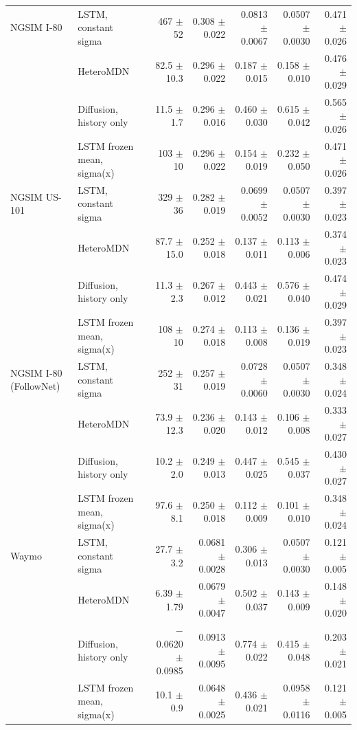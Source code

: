 \begin{table}[htbp]
\begin{tabular}{llrrrrr}
\midrule
NGSIM I-80 & LSTM, constant sigma & 467 $\pm$ 52 & 0.308 $\pm$ 0.022 & 0.0813 $\pm$ 0.0067 & 0.0507 $\pm$ 0.0030 & 0.471 $\pm$ 0.026 \\
 & HeteroMDN & 82.5 $\pm$ 10.3 & 0.296 $\pm$ 0.022 & 0.187 $\pm$ 0.015 & 0.158 $\pm$ 0.010 & 0.476 $\pm$ 0.029 \\
 & Diffusion, history only & 11.5 $\pm$ 1.7 & 0.296 $\pm$ 0.016 & 0.460 $\pm$ 0.030 & 0.615 $\pm$ 0.042 & 0.565 $\pm$ 0.026 \\
 & LSTM frozen mean, sigma(x) & 103 $\pm$ 10 & 0.296 $\pm$ 0.022 & 0.154 $\pm$ 0.019 & 0.232 $\pm$ 0.050 & 0.471 $\pm$ 0.026 \\
\midrule
NGSIM US-101 & LSTM, constant sigma & 329 $\pm$ 36 & 0.282 $\pm$ 0.019 & 0.0699 $\pm$ 0.0052 & 0.0507 $\pm$ 0.0030 & 0.397 $\pm$ 0.023 \\
 & HeteroMDN & 87.7 $\pm$ 15.0 & 0.252 $\pm$ 0.018 & 0.137 $\pm$ 0.011 & 0.113 $\pm$ 0.006 & 0.374 $\pm$ 0.023 \\
 & Diffusion, history only & 11.3 $\pm$ 2.3 & 0.267 $\pm$ 0.012 & 0.443 $\pm$ 0.021 & 0.576 $\pm$ 0.040 & 0.474 $\pm$ 0.029 \\
 & LSTM frozen mean, sigma(x) & 108 $\pm$ 10 & 0.274 $\pm$ 0.018 & 0.113 $\pm$ 0.008 & 0.136 $\pm$ 0.019 & 0.397 $\pm$ 0.023 \\
\midrule
NGSIM I-80 (FollowNet) & LSTM, constant sigma & 252 $\pm$ 31 & 0.257 $\pm$ 0.019 & 0.0728 $\pm$ 0.0060 & 0.0507 $\pm$ 0.0030 & 0.348 $\pm$ 0.024 \\
 & HeteroMDN & 73.9 $\pm$ 12.3 & 0.236 $\pm$ 0.020 & 0.143 $\pm$ 0.012 & 0.106 $\pm$ 0.008 & 0.333 $\pm$ 0.027 \\
 & Diffusion, history only & 10.2 $\pm$ 2.0 & 0.249 $\pm$ 0.013 & 0.447 $\pm$ 0.025 & 0.545 $\pm$ 0.037 & 0.430 $\pm$ 0.027 \\
 & LSTM frozen mean, sigma(x) & 97.6 $\pm$ 8.1 & 0.250 $\pm$ 0.018 & 0.112 $\pm$ 0.009 & 0.101 $\pm$ 0.010 & 0.348 $\pm$ 0.024 \\
\midrule
Waymo & LSTM, constant sigma & 27.7 $\pm$ 3.2 & 0.0681 $\pm$ 0.0028 & 0.306 $\pm$ 0.013 & 0.0507 $\pm$ 0.0030 & 0.121 $\pm$ 0.005 \\
 & HeteroMDN & 6.39 $\pm$ 1.79 & 0.0679 $\pm$ 0.0047 & 0.502 $\pm$ 0.037 & 0.143 $\pm$ 0.009 & 0.148 $\pm$ 0.020 \\
 & Diffusion, history only & $-$0.0620 $\pm$ 0.0985 & 0.0913 $\pm$ 0.0095 & 0.774 $\pm$ 0.022 & 0.415 $\pm$ 0.048 & 0.203 $\pm$ 0.021 \\
 & LSTM frozen mean, sigma(x) & 10.1 $\pm$ 0.9 & 0.0648 $\pm$ 0.0025 & 0.436 $\pm$ 0.021 & 0.0958 $\pm$ 0.0116 & 0.121 $\pm$ 0.005 \\

\end{tabular}
\end{table}
